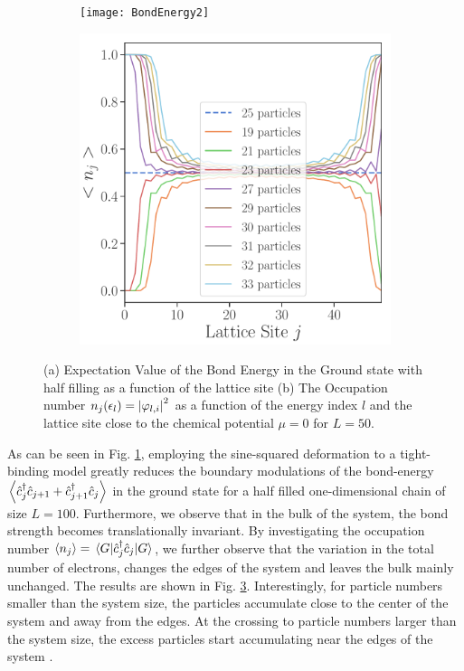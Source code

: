 \documentclass[11pt, a4paper, oneside]{book}
\theoremstyle{definition} %
\begin{document}
\begin{figure}[h]
\centering
\begin{subfigure}[t]{0.49\textwidth}
	\centering
	\texttt{[image: BondEnergy2]}
	\caption{}
	\label{BondEnergy}
\end{subfigure}
\begin{subfigure}[t]{0.49\textwidth}
	\centering
	\includegraphics[width =\textwidth]{Occupation_number_H1}
	\caption{}
	\label{Occupation_number_H1}
\end{subfigure}
\caption{(a) Expectation Value of the Bond Energy in the Ground state with half filling as a function of the lattice site (b) The Occupation number $n_j(\epsilon_l) = \abs{\varphi_{l,i}}^2$ as a function of the energy index $l$ and the lattice site close to the chemical potential $\mu = 0$ for $L = 50$.}
\end{figure}	

 As can be seen in Fig. \ref{BondEnergy}, employing the sine-squared deformation to a tight-binding model greatly reduces the boundary modulations of the bond-energy $\expval{\hat{c}_j^\dagger\hat{c}_{j+1} + \hat{c}_{j+1}^\dagger \hat{c}_j}$ in the ground state for a half filled one-dimensional chain of size $L=100$. Furthermore, we observe that in the bulk of the system, the bond strength becomes translationally invariant. By investigating the occupation number $\expval{n_j} = \mel{G}{\hat{c}_j^\dagger \hat{c}_j}{G}$, we further observe that the variation in the total number of electrons, changes the edges of the system and leaves the bulk mainly unchanged. The results are shown in Fig. \ref{Occupation_number_H1}. Interestingly, for particle numbers smaller than the system size, the particles accumulate close to the center of the system and away from the edges. At the crossing to particle numbers larger than the system size, the excess particles start accumulating near the edges of the system \cite{Hotta}.  \\
\end{document}
